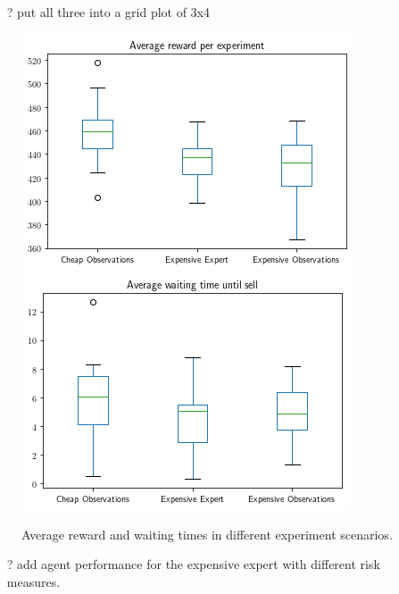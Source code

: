 \begin{itemize}
    \item[?] put all three into a grid plot of 3x4
\end{itemize}

\begin{figure}
\includegraphics[width=0.45\linewidth]{img/avg_reward.png}
\includegraphics[width=0.45\linewidth]{img/avg_waiting.png}
\caption{Average reward and waiting times in different experiment scenarios.}
\end{figure}

\begin{itemize}
    \item[?] add agent performance for the expensive expert with different risk measures.
\end{itemize}